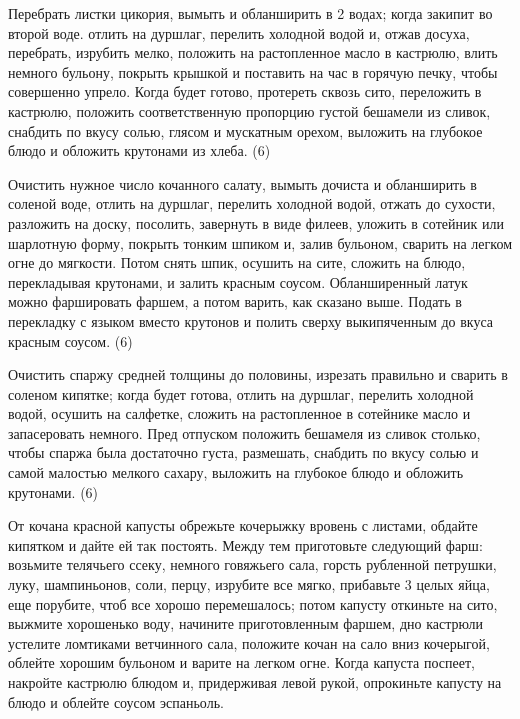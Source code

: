 
Перебрать листки цикория, вымыть и обланширить в 2 водах; когда закипит во второй воде. отлить на дуршлаг, перелить холодной водой и, отжав досуха, перебрать, изрубить мелко, положить на растопленное масло в кастрюлю, влить немного бульону, покрыть крышкой и поставить на час в горячую печку, чтобы совершенно упрело. Когда будет готово, протереть сквозь сито, переложить в кастрюлю, положить соответственную пропорцию густой бешамели из сливок, снабдить по вкусу солью, глясом и мускатным орехом, выложить на глубокое блюдо и обложить крутонами из хлеба. (6) 


Очистить нужное число кочанного салату, вымыть дочиста и обланширить в соленой воде, отлить на дуршлаг, перелить холодной водой, отжать до сухости, разложить на доску, посолить, завернуть в виде филеев, уложить в сотейник или шарлотную форму, покрыть тонким шпиком и, залив бульоном, сварить на легком огне до мягкости. Потом снять шпик, осушить на сите, сложить на блюдо, перекладывая крутонами, и залить красным соусом. Обланширенный латук можно фаршировать фаршем, а потом варить, как сказано выше. Подать в перекладку с языком вместо крутонов и полить сверху выкипяченным до вкуса красным соусом. (6)


Очистить спаржу средней толщины до половины, изрезать правильно и сварить в соленом кипятке; когда будет готова, отлить на дуршлаг, перелить холодной водой, осушить на салфетке, сложить на растопленное в сотейнике масло и запасеровать немного. Пред отпуском положить бешамеля из сливок столько, чтобы спаржа была достаточно густа, размешать, снабдить по вкусу солью и самой малостью мелкого сахару, выложить на глубокое блюдо и обложить крутонами. (6) 


От кочана красной капусты обрежьте кочерыжку вровень с листами, обдайте кипятком и дайте ей так постоять. Между тем приготовьте следующий фарш: возьмите телячьего ссеку, немного говяжьего сала, горсть рубленной петрушки, луку, шампиньонов, соли, перцу, изрубите все мягко, прибавьте 3 целых яйца, еще порубите, чтоб все хорошо перемешалось; потом капусту откиньте на сито, выжмите хорошенько воду, начините приготовленным фаршем, дно кастрюли устелите ломтиками ветчинного сала, положите кочан на сало вниз кочерыгой, облейте хорошим бульоном и варите на легком огне. Когда капуста поспеет, накройте кастрюлю блюдом и, придерживая левой рукой, опрокиньте капусту на блюдо и облейте соусом эспаньоль. 

